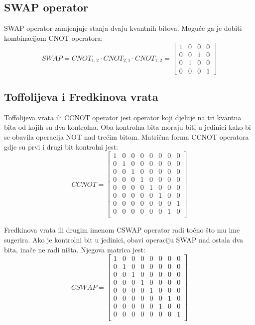\subsection{SWAP operator}

SWAP operator zamjenjuje stanja dvaju kvantnih bitova. Moguće ga je dobiti kombinacijom CNOT operatora:
\[
\textit{SWAP} = CNOT_{1,2}\cdot CNOT_{2,1}\cdot CNOT_{1,2} = \begin{bmatrix}
1 & 0 & 0 & 0 \\ 0 & 0 & 1 & 0 \\ 0 & 1 & 0 & 0 \\ 0 & 0 & 0 & 1
\end{bmatrix}
\]

\subsection{Toffolijeva i Fredkinova vrata}

Toffolijeva vrata ili CCNOT operator jest operator koji djeluje na tri kvantna bita od kojih su dva kontrolna. Oba kontrolna bita moraju biti u jedinici kako bi se obavila operacija NOT nad trećim bitom. Matrična forma CCNOT operatora gdje su prvi i drugi bit kontrolni jest:
\[
\textit{CCNOT}= \begin{bmatrix}
1 & 0 & 0 & 0 & 0 & 0 & 0 & 0 \\
0 & 1 & 0 & 0 & 0 & 0 & 0 & 0 \\
0 & 0 & 1 & 0 & 0 & 0 & 0 & 0 \\
0 & 0 & 0 & 1 & 0 & 0 & 0 & 0 \\
0 & 0 & 0 & 0 & 1 & 0 & 0 & 0 \\
0 & 0 & 0 & 0 & 0 & 1 & 0 & 0 \\
0 & 0 & 0 & 0 & 0 & 0 & 0 & 1 \\
0 & 0 & 0 & 0 & 0 & 0 & 1 & 0 \\
\end{bmatrix}
\]

Fredkinova vrata ili drugim imenom CSWAP operator radi točno što mu ime sugerira. Ako je kontrolni bit u jedinici, obavi operaciju SWAP nad ostala dva bita, inače ne radi ništa. Njegova matrica jest:
\[
\textit{CSWAP} = \begin{bmatrix}
1 & 0 & 0 & 0 & 0 & 0 & 0 & 0 \\
0 & 1 & 0 & 0 & 0 & 0 & 0 & 0 \\
0 & 0 & 1 & 0 & 0 & 0 & 0 & 0 \\
0 & 0 & 0 & 1 & 0 & 0 & 0 & 0 \\
0 & 0 & 0 & 0 & 1 & 0 & 0 & 0 \\
0 & 0 & 0 & 0 & 0 & 0 & 1 & 0 \\
0 & 0 & 0 & 0 & 0 & 1 & 0 & 0 \\
0 & 0 & 0 & 0 & 0 & 0 & 0 & 1 \\
\end{bmatrix}
\]

